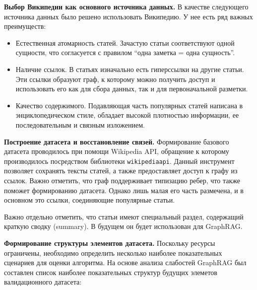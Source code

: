 \textbf{Выбор Википедии как основного источника данных.}
В качестве следующего источника данных было решено использовать Википедию.
У нее есть ряд важных преимуществ:
\begin{itemize}
      \item Естественная атомарность статей. Зачастую статьи соответствуют одной сущности,
            что согласуется с правилом ``одна заметка = одна сущность''.
      \item Наличие ссылок. В статьях изначально есть гиперссылки на другие статьи.
            Эти ссылки образуют граф,
            к которому можно получить доступ и использовать его как для сбора данных,
            так и для первоначальной разметки.
      \item Качество содержимого. Подавляющая часть популярных статей
            написана в энциклопедическом стиле,
            обладает высокой плотностью информации, ее последовательным и связным изложением.
\end{itemize}


\textbf{Построение датасета и восстановление связей.}
Формирование базового датасета проводилось при помощи Wikipedia API,
обращение к которому производилось посредством библиотеки \texttt{wikipediaapi}.
Данный инструмент позволяет сохранять тексты статей, а также предоставляет доступ к графу из ссылок.
Важно отметить, что граф поддерживает типизацию ребер, что также поможет формированию датасета.
Однако лишь малая его часть размечена, и в основном это ссылки, соединяющие популярные статьи.

Важно отдельно отметить, что статьи имеют специальный раздел, содержащий краткую сводку (summary).
В будущем он будет использован для GraphRAG.

\textbf{Формирование структуры элементов датасета.}
Поскольку ресурсы ограничены,
необходимо определить несколько наиболее показательных сценариев для оценки алгоритма.
На основе анализа слабостей GraphRAG
был составлен список наиболее показательных структур будущих элеметов валидационного датасета:

